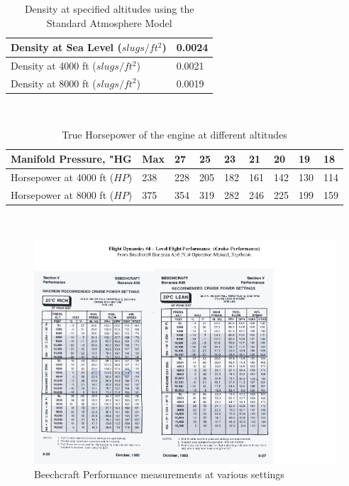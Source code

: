 \documentclass[letterpaper,11pt]{texMemo}
\begin{document}
\begin{table}[h]
\centering
\begin{tabular}{|l|l|} \hline
	{Density at Sea Level (\(slugs/ft^2\))} & 0.0024 \\ \hline
	{Density at 4000 ft (\(slugs/ft^2\))} & 0.0021 \\ \hline
	{Density at 8000 ft (\(slugs/ft^2\))} & 0.0019 \\ \hline
\end{tabular} \\
\caption{Density at specified altitudes using the Standard Atmosphere Model} \label{tab:Table3}
\end{table}

\begin{table}[h]
\centering
\begin{tabular}{|l|l|l|l|l|l|l|l|l|} \hline
	{Manifold Pressure, "HG} & Max & 27 & 25 & 23 & 21 & 20 & 19 & 18\\ \hline
	{Horsepower at 4000 ft (\(HP\))} & 238 & 228 & 205 & 182 & 161 & 142 & 130 & 114\\ \hline
	{Horsepower at 8000 ft (\(HP\))} & 375 & 354 & 319 & 282 & 246 & 225 & 199 & 159\\ \hline
\end{tabular} \\
\caption{True Horsepower of the engine at different altitudes} \label{tab:Table3}
\end{table}

\begin{figure}[here]
	\includegraphics[width=1\textwidth]{Cruise_Performance.png}
	\caption{Beechcraft Performance measurements at various settings}
	\label{fig:Figure1}
\end{figure}
\end{document}
